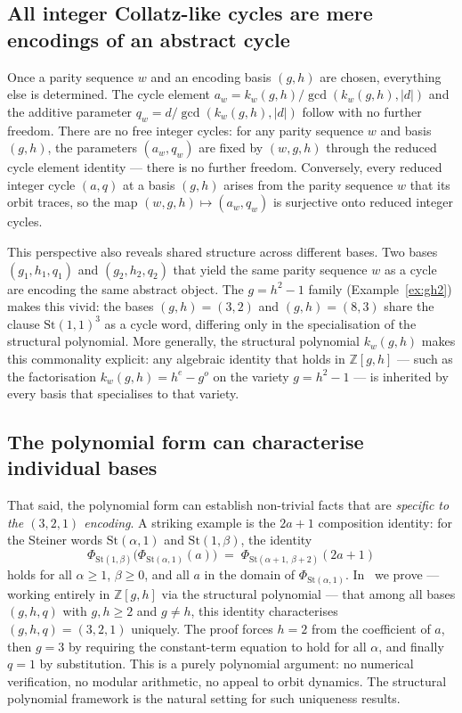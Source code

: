\documentclass[12pt]{article}
\theoremstyle{definition}
\theoremstyle{remark}
\newcommand{\ZZ}{\mathbb{Z}}
\newcommand{\St}{\mathrm{St}}
\newcommand{\kpoly}{k}
\begin{document}
\subsection*{All integer Collatz-like cycles are mere encodings of an abstract cycle}

Once a parity sequence $w$ and an encoding basis $(g,h)$ are chosen,
everything else is determined.  The cycle element $a_w = \kpoly_w(g,h) /
\gcd(\kpoly_w(g,h), |d|)$ and the additive parameter $q_w = d /
\gcd(\kpoly_w(g,h), |d|)$ follow with no further freedom.  There are no
free integer cycles: for any parity sequence $w$ and basis $(g,h)$, the
parameters $(a_w, q_w)$ are fixed by $(w, g, h)$ through the reduced cycle
element identity — there is no further freedom.  Conversely, every reduced
integer cycle $(a, q)$ at a basis $(g,h)$ arises from the parity sequence
$w$ that its orbit traces, so the map $(w, g, h) \mapsto (a_w, q_w)$ is
surjective onto reduced integer cycles.

This perspective also reveals shared structure across different bases.
Two bases $(g_1,h_1,q_1)$ and $(g_2,h_2,q_2)$ that yield the same
parity sequence $w$ as a cycle are encoding the same abstract object.
The $g = h^2 - 1$ family (Example~\ref{ex:gh2}) makes this vivid: the
bases $(g,h) = (3,2)$ and $(g,h) = (8,3)$ share the clause $\St(1,1)^3$
as a cycle word, differing only in the specialisation of the structural
polynomial.  More generally, the structural polynomial $\kpoly_w(g,h)$
makes this commonality explicit: any algebraic identity that holds in
$\ZZ[g,h]$ — such as the factorisation $\kpoly_w(g,h) = h^e - g^o$ on
the variety $g = h^2 - 1$ — is inherited by every basis that specialises
to that variety.

\subsection*{The polynomial form can characterise individual bases}

That said, the polynomial form can establish non-trivial facts that are
\emph{specific to the $(3,2,1)$ encoding}.  A striking example is the
$2a+1$ composition identity: for the Steiner words $\St(\alpha,1)$ and
$\St(1,\beta)$, the identity
\[
  \Phi_{\St(1,\beta)}\!\bigl(\Phi_{\St(\alpha,1)}(a)\bigr)
  \;=\; \Phi_{\St(\alpha+1,\,\beta+2)}(2a+1)
\]
holds for all $\alpha \geq 1$, $\beta \geq 0$, and all $a$ in the domain
of $\Phi_{\St(\alpha,1)}$.
In~\cite{paper73} we prove — working entirely in $\ZZ[g,h]$ via the
structural polynomial — that among all bases $(g,h,q)$ with $g,h \geq 2$
and $g \neq h$, this identity characterises $(g,h,q) = (3,2,1)$ uniquely.
The proof forces $h = 2$ from the coefficient of $a$, then $g = 3$ by
requiring the constant-term equation to hold for all $\alpha$, and finally
$q = 1$ by substitution.  This is a purely polynomial argument: no
numerical verification, no modular arithmetic, no appeal to orbit dynamics.
The structural polynomial framework is the natural setting for such
uniqueness results.
\end{document}

